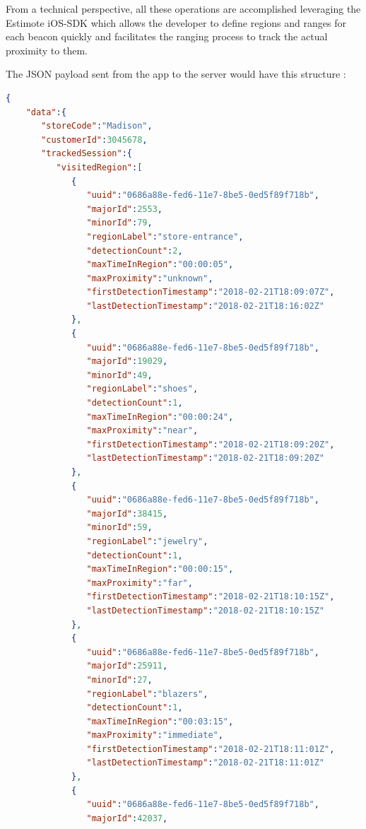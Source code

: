 From a technical perspective, all these operations are accomplished leveraging the Estimote iOS-SDK \cite{estimote-ios-sdk} which allows the developer to define regions and ranges for each beacon quickly and facilitates the ranging process to track the actual proximity to them.

The JSON payload sent from the app to the server would have this structure :


\vspace{0.5cm}
\begin{lstlisting}[language=json,firstnumber=1]
  {
    "data":{
       "storeCode":"Madison",
       "customerId":3045678,
       "trackedSession":{
          "visitedRegion":[
             {
                "uuid":"0686a88e-fed6-11e7-8be5-0ed5f89f718b",
                "majorId":2553,
                "minorId":79,
                "regionLabel":"store-entrance",
                "detectionCount":2,
                "maxTimeInRegion":"00:00:05",
                "maxProximity":"unknown",
                "firstDetectionTimestamp":"2018-02-21T18:09:07Z",
                "lastDetectionTimestamp":"2018-02-21T18:16:02Z"
             },
             {
                "uuid":"0686a88e-fed6-11e7-8be5-0ed5f89f718b",
                "majorId":19029,
                "minorId":49,
                "regionLabel":"shoes",
                "detectionCount":1,
                "maxTimeInRegion":"00:00:24",
                "maxProximity":"near",
                "firstDetectionTimestamp":"2018-02-21T18:09:20Z",
                "lastDetectionTimestamp":"2018-02-21T18:09:20Z"
             },
             {
                "uuid":"0686a88e-fed6-11e7-8be5-0ed5f89f718b",
                "majorId":38415,
                "minorId":59,
                "regionLabel":"jewelry",
                "detectionCount":1,
                "maxTimeInRegion":"00:00:15",
                "maxProximity":"far",
                "firstDetectionTimestamp":"2018-02-21T18:10:15Z",
                "lastDetectionTimestamp":"2018-02-21T18:10:15Z"
             },
             {
                "uuid":"0686a88e-fed6-11e7-8be5-0ed5f89f718b",
                "majorId":25911,
                "minorId":27,
                "regionLabel":"blazers",
                "detectionCount":1,
                "maxTimeInRegion":"00:03:15",
                "maxProximity":"immediate",
                "firstDetectionTimestamp":"2018-02-21T18:11:01Z",
                "lastDetectionTimestamp":"2018-02-21T18:11:01Z"
             },
             {
                "uuid":"0686a88e-fed6-11e7-8be5-0ed5f89f718b",
                "majorId":42037,

\end{lstlisting}
